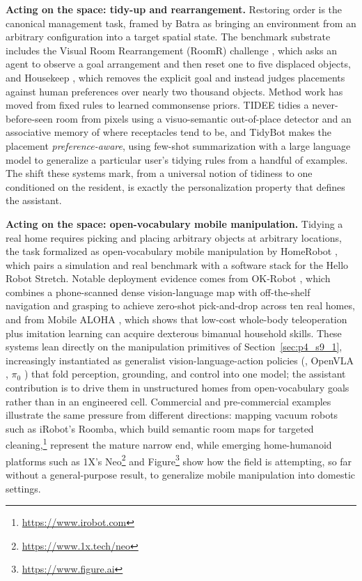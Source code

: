 \textbf{Acting on the space: tidy-up and rearrangement.} Restoring order is the canonical management task, framed by Batra \etal \cite{batra2020rearrangement} as bringing an environment from an arbitrary configuration into a target spatial state. 
The benchmark substrate includes the Visual Room Rearrangement (RoomR) challenge \cite{weihs2021visual}, which asks an agent to observe a goal arrangement and then reset one to five displaced objects, and Housekeep \cite{kant2022housekeep}, which removes the explicit goal and instead judges placements against human preferences over nearly two thousand objects. 
Method work has moved from fixed rules to learned commonsense priors. 
TIDEE \cite{sarch2022tidee} tidies a never-before-seen room from pixels using a visuo-semantic out-of-place detector and an associative memory of where receptacles tend to be, and TidyBot \cite{wu2023tidybot} makes the placement \emph{preference-aware}, using few-shot summarization with a large language model to generalize a particular user's tidying rules from a handful of examples. 
The shift these systems mark, from a universal notion of tidiness to one conditioned on the resident, is exactly the personalization property that defines the assistant.

\textbf{Acting on the space: open-vocabulary mobile manipulation.} Tidying a real home requires picking and placing arbitrary objects at arbitrary locations, the task formalized as open-vocabulary mobile manipulation by HomeRobot \cite{yenamandra2023homerobot}, which pairs a simulation and real benchmark with a software stack for the Hello Robot Stretch. 
Notable deployment evidence comes from OK-Robot \cite{liu2024okrobot}, which combines a phone-scanned dense vision-language map with off-the-shelf navigation and grasping to achieve zero-shot pick-and-drop across ten real homes, and from Mobile ALOHA \cite{fu2024mobilealoha}, which shows that low-cost whole-body teleoperation plus imitation learning can acquire dexterous bimanual household skills. 
These systems lean directly on the manipulation primitives of Section~\ref{sec:p4_s9_1}, increasingly instantiated as generalist vision-language-action policies (\eg, OpenVLA \cite{kim2024openvla}, $\pi_0$ \cite{black2024pi0}) that fold perception, grounding, and control into one model; the assistant contribution is to drive them in unstructured homes from open-vocabulary goals rather than in an engineered cell. 
Commercial and pre-commercial examples illustrate the same pressure from different directions: mapping vacuum robots such as iRobot's Roomba, which build semantic room maps for targeted cleaning,\footnote{\url{https://www.irobot.com}} represent the mature narrow end, while emerging home-humanoid platforms such as 1X's Neo\footnote{\url{https://www.1x.tech/neo}} and Figure\footnote{\url{https://www.figure.ai}} show how the field is attempting, so far without a general-purpose result, to generalize mobile manipulation into domestic settings.

